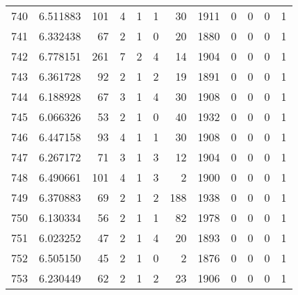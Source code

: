 \begin{tabular}{lrrrrrrrrrrr}
740 &  6.511883 &  101 &      4 &        1 &      1 &              30 &  1911 &               0 &               0 &               0 &               1 \\
741 &  6.332438 &   67 &      2 &        1 &      0 &              20 &  1880 &               0 &               0 &               0 &               1 \\
742 &  6.778151 &  261 &      7 &        2 &      4 &              14 &  1904 &               0 &               0 &               0 &               1 \\
743 &  6.361728 &   92 &      2 &        1 &      2 &              19 &  1891 &               0 &               0 &               0 &               1 \\
744 &  6.188928 &   67 &      3 &        1 &      4 &              30 &  1908 &               0 &               0 &               0 &               1 \\
745 &  6.066326 &   53 &      2 &        1 &      0 &              40 &  1932 &               0 &               0 &               0 &               1 \\
746 &  6.447158 &   93 &      4 &        1 &      1 &              30 &  1908 &               0 &               0 &               0 &               1 \\
747 &  6.267172 &   71 &      3 &        1 &      3 &              12 &  1904 &               0 &               0 &               0 &               1 \\
748 &  6.490661 &  101 &      4 &        1 &      3 &               2 &  1900 &               0 &               0 &               0 &               1 \\
749 &  6.370883 &   69 &      2 &        1 &      2 &             188 &  1938 &               0 &               0 &               0 &               1 \\
750 &  6.130334 &   56 &      2 &        1 &      1 &              82 &  1978 &               0 &               0 &               0 &               1 \\
751 &  6.023252 &   47 &      2 &        1 &      4 &              20 &  1893 &               0 &               0 &               0 &               1 \\
752 &  6.505150 &   45 &      2 &        1 &      0 &               2 &  1876 &               0 &               0 &               0 &               1 \\
753 &  6.230449 &   62 &      2 &        1 &      2 &              23 &  1906 &               0 &               0 &               0 &               1 \\

\end{tabular}
